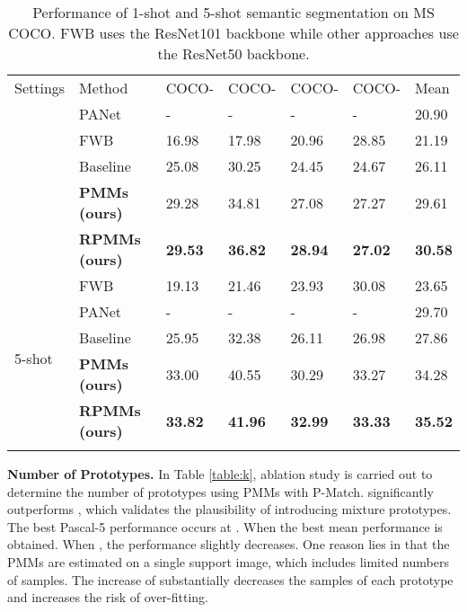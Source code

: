 \documentclass[runningheads]{llncs}
\begin{document}
\setlength{\tabcolsep}{4pt}
\begin{table}[!t]
\begin{center}
\caption{Performance of 1-shot and 5-shot semantic segmentation on MS COCO. FWB uses the ResNet101 backbone while other approaches use the ResNet50 backbone.}
\label{table:coco-res}
\begin{tabular}{lllllll}
\hline\noalign{\smallskip}
Settings & Method & COCO- & COCO- & COCO- & COCO- & Mean \\
\noalign{\smallskip}
\hline
\multirow{5}{*}{1-shot} 
& PANet~\cite{PANet}                     &- &- &- &- & 20.90\\
& FWB~\cite{FWB-ICCV2019}                &16.98 &17.98 &20.96 &28.85 & 21.19\\
& Baseline                               &25.08 &30.25 &24.45 &24.67 &26.11\\
& {\bf PMMs (ours)}                      &29.28  &34.81  &27.08  &27.27  &29.61  \\
& {\bf RPMMs (ours)}                      &\bf29.53  &\bf36.82  &\bf28.94  &\bf27.02  &\bf30.58  \\
\hline
\multirow{5}{*}{5-shot} 
& FWB ~\cite{FWB-ICCV2019}              &19.13&21.46 &23.93 &30.08 & 23.65 \\
& PANet~\cite{PANet}                     &- &- &- &- & 29.70 \\
& Baseline                               &25.95 &32.38 &26.11 &26.98 &27.86\\
& {\bf PMMs (ours)}                      &33.00  &40.55  &30.29  &33.27  &34.28  \\
& {\bf RPMMs (ours)}                     &\bf33.82  &\bf41.96  &\bf32.99  &\bf33.33  &\bf35.52  \\
\hline
\vspace{-0.2cm}
\end{tabular}
\end{center}
\end{table}
\setlength{\tabcolsep}{1.4pt}   

\textbf{Number of Prototypes.} In Table \ref{table:k}, ablation study is carried out to determine the number of prototypes using PMMs with P-Match.  significantly outperforms , which validates the plausibility of introducing mixture prototypes. 
The best Pascal-5 performance occurs at . When  the best mean performance is obtained. When , the performance slightly decreases. One reason lies in that the PMMs are estimated on a single support image, which includes limited numbers of samples. The increase of  substantially decreases the samples of each prototype and increases the risk of over-fitting. 
\end{document}

